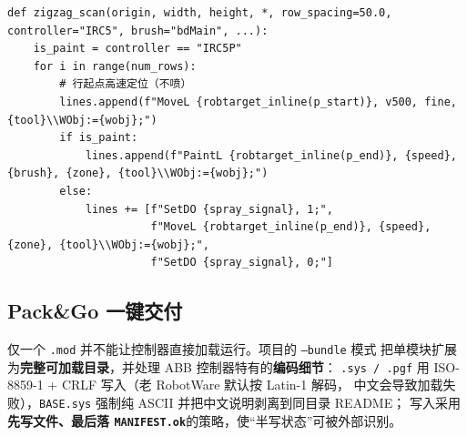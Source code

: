 \documentclass[12pt,a4paper,fontset=none]{ctexart}
\begin{document}
\begin{lstlisting}[style=py,caption={喷涂 helper：同一调用按控制器产出不同 RAPID（Z 字扫描节选）}]
def zigzag_scan(origin, width, height, *, row_spacing=50.0, controller="IRC5", brush="bdMain", ...):
    is_paint = controller == "IRC5P"
    for i in range(num_rows):
        # 行起点高速定位（不喷）
        lines.append(f"MoveL {robtarget_inline(p_start)}, v500, fine, {tool}\\WObj:={wobj};")
        if is_paint:
            lines.append(f"PaintL {robtarget_inline(p_end)}, {speed}, {brush}, {zone}, {tool}\\WObj:={wobj};")
        else:
            lines += [f"SetDO {spray_signal}, 1;",
                      f"MoveL {robtarget_inline(p_end)}, {speed}, {zone}, {tool}\\WObj:={wobj};",
                      f"SetDO {spray_signal}, 0;"]
\end{lstlisting}

\subsection{Pack\&Go 一键交付}
仅一个 \texttt{.mod} 并不能让控制器直接加载运行。项目的 \texttt{--bundle} 模式
把单模块扩展为\textbf{完整可加载目录}，并处理 ABB 控制器特有的\textbf{编码细节}：
\texttt{.sys / .pgf} 用 ISO-8859-1 + CRLF 写入（老 RobotWare 默认按 Latin-1 解码，
中文会导致加载失败），\texttt{BASE.sys} 强制纯 ASCII 并把中文说明剥离到同目录 README；
写入采用\textbf{先写文件、最后落 \texttt{MANIFEST.ok}}的策略，使“半写状态”可被外部识别。

\begin{center}
\end{center}
\end{document}
